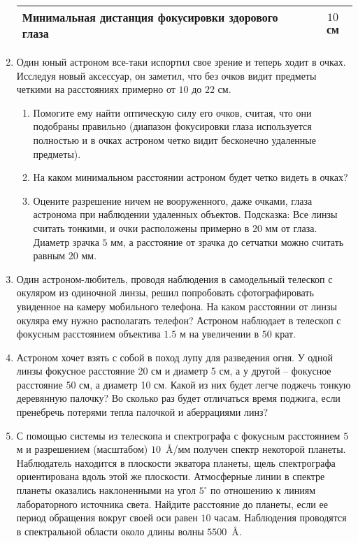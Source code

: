\documentclass[12pt]{article}
\begin{document}
\begin{enumerate}
\begin{table}[h]
\begin{tabular}{|l|c|}
            Минимальная дистанция фокусировки здорового глаза & $10$ см \\ \hline
        \end{tabular}
    \end{table}
    \item Один юный астроном все-таки испортил свое зрение и теперь ходит в очках. Исследуя новый аксессуар, он заметил, что без очков видит предметы четкими на расстояниях примерно от $10$ до $22$ см.
    \begin{enumerate}
        \item Помогите ему найти оптическую силу его очков, считая, что они подобраны правильно (диапазон фокусировки глаза используется полностью и в очках астроном четко видит бесконечно удаленные предметы).
        \item На каком минимальном расстоянии астроном будет четко видеть в очках?
        \item Оцените разрешение ничем не вооруженного, даже очками, глаза астронома при наблюдении удаленных объектов.
        Подсказка: Все линзы считать тонкими, и очки расположены примерно в $20$ мм от глаза. Диаметр зрачка $5$ мм, а расстояние от зрачка до сетчатки можно считать равным $20$ мм.
    \end{enumerate}
    \item Один астроном-любитель, проводя наблюдения в самодельный телескоп с окуляром из одиночной линзы, решил попробовать сфотографировать увиденное на камеру мобильного телефона. На каком расстоянии от линзы окуляра ему нужно располагать телефон? Астроном наблюдает в телескоп с фокусным расстоянием объектива $1.5$ м на увеличении в $50$ крат.
    \item Астроном хочет взять с собой в поход лупу для разведения огня. У одной линзы фокусное расстояние 20 см и диаметр 5 см, а у другой -- фокусное расстояние 50 см, а диаметр 10 см. Какой из них будет легче поджечь тонкую деревянную палочку? Во сколько раз будет отличаться время поджига, если пренебречь потерями тепла палочкой и аберрациями линз?
    \item С помощью системы из телескопа и спектрографа с фокусным расстоянием $5$ м и разрешением (масштабом) $10$~\AA/мм получен спектр некоторой планеты. Наблюдатель находится в плоскости экватора планеты, щель спектрографа ориентирована вдоль этой же плоскости. Атмосферные линии в спектре планеты оказались наклоненными на угол $5^{\circ}$ по отношению к линиям лабораторного источника света. Найдите расстояние до планеты, если ее период обращения вокруг своей оси равен $10$ часам. Наблюдения проводятся в спектральной области около длины волны $5500$~\AA.

\end{enumerate}
\end{document}
